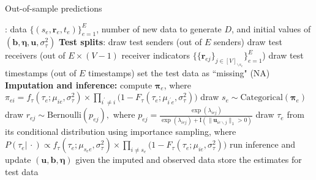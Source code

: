 \documentclass[ba]{imsart}
\def\spacingset#1{\renewcommand{\baselinestretch}%
	{#1}\small\normalsize} \spacingset{1}
\numberwithin{equation}{section}
\theoremstyle{plain}
\begin{document}
	\begin{algorithm}[!t]
		\spacingset{1}
		\caption{Out-of-sample predictions}
		\label{alg:PPE}
		\begin{algorithmic}
			: data $ \{ (s_e, \boldsymbol{r}_e, t_e)\}_{e=1}^E$, 
			number of new data to generate $D$, and initial values of $(\boldsymbol{b}, \boldsymbol{\eta}, \boldsymbol{u}, \sigma^2_\tau)$
			\vskip 0.1in
			\textbf{Test splits}:	
			\STATE draw test senders (out of $E$ senders) 
			\STATE draw test receivers (out of $E\times (V-1)$ receiver indicators $\{\{\boldsymbol{r}_{ej}\}_{j\in [V]_{\backslash s_e}}\}_{e=1}^E$)
			\STATE draw test timestamps  (out of $E$ timestamps) 
			\STATE set the test data as ``missing" (NA)
			\vskip 0.1in
			\textbf{Imputation and inference:}	
			\STATE compute $\boldsymbol{\pi}_e$, where $\pi_{ei}=f_{\tau}(\tau_{e}; \mu_{ie}, \sigma_\tau^2)\times \prod_{i^\prime\neq i}\big(1-F_{\tau}(\tau_{e}; \mu_{i^\prime e}, \sigma_\tau^2) \big)$
			\STATE draw $s_e \sim \mbox{Categorical}(\boldsymbol{\pi}_e)$ 
			\ENDIF
			\STATE draw $r_{ej} \sim \mbox{Bernoulli}(p_{ej}),$
			where $p_{ej}=\frac{\exp(\lambda_{iej})}{\exp(\lambda_{iej})+\text{I}(\lVert\boldsymbol{u}_{ie\backslash j}\rVert_1 > 0 )}$ %
			\ENDIF
			\ENDFOR
			\STATE draw ${\tau}_e$ from its conditional distribution using importance sampling, %
	      where $P({\tau}_e|\, \cdot)\propto f_{\tau}(\tau_{e}; \mu_{s_e e}, \sigma_\tau^2)\times \prod_{i\neq s_e}\big(1-F_{\tau}(\tau_{e}; \mu_{ie}, \sigma_\tau^2) \big)$%
			\ENDIF
			\STATE run inference and update $(\boldsymbol{u},\boldsymbol{b}, \boldsymbol{\eta})$ given the imputed and observed data
			\ENDFOR
			\STATE store the estimates for test data
			\ENDFOR
		\end{algorithmic}
	\end{algorithm}
	
\end{document}
